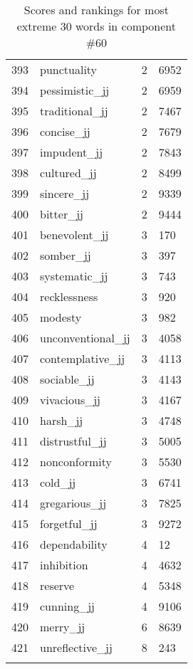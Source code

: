 \begin{longtable}[!htbp]{| rlr@{.}l |}
    393 & punctuality & 2 & 6952 \\
    394 & pessimistic\_jj & 2 & 6959 \\
    395 & traditional\_jj & 2 & 7467 \\
    396 & concise\_jj & 2 & 7679 \\
    397 & impudent\_jj & 2 & 7843 \\
    398 & cultured\_jj & 2 & 8499 \\
    399 & sincere\_jj & 2 & 9339 \\
    400 & bitter\_jj & 2 & 9444 \\
    401 & benevolent\_jj & 3 & 170 \\
    402 & somber\_jj & 3 & 397 \\
    403 & systematic\_jj & 3 & 743 \\
    404 & recklessness & 3 & 920 \\
    405 & modesty & 3 & 982 \\
    406 & unconventional\_jj & 3 & 4058 \\
    407 & contemplative\_jj & 3 & 4113 \\
    408 & sociable\_jj & 3 & 4143 \\
    409 & vivacious\_jj & 3 & 4167 \\
    410 & harsh\_jj & 3 & 4748 \\
    411 & distrustful\_jj & 3 & 5005 \\
    412 & nonconformity & 3 & 5530 \\
    413 & cold\_jj & 3 & 6741 \\
    414 & gregarious\_jj & 3 & 7825 \\
    415 & forgetful\_jj & 3 & 9272 \\
    416 & dependability & 4 & 12 \\
    417 & inhibition & 4 & 4632 \\
    418 & reserve & 4 & 5348 \\
    419 & cunning\_jj & 4 & 9106 \\
    420 & merry\_jj & 6 & 8639 \\
    421 & unreflective\_jj & 8 & 243 \\
    \hline
    \caption{Scores and rankings for most extreme 30 words in component \#60} \\
\end{longtable}
